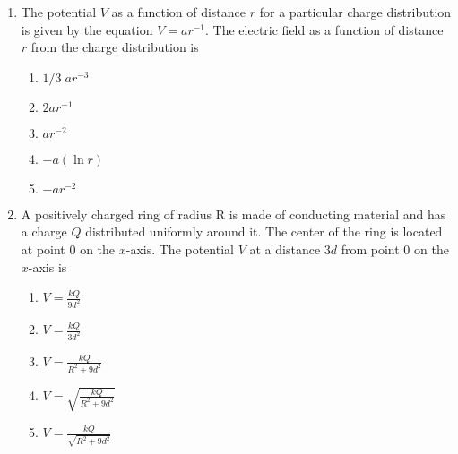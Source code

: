 \documentclass{../../oss-apphys}
\begin{document}
\begin{multicols}{2}
\begin{enumerate}[leftmargin=18pt]
  \item The potential $V$ as a function of distance $r$ for a particular charge
    distribution is given by the equation $V=ar^{-1}$. The electric field as
    a function of distance $r$ from the charge distribution is
    \begin{enumerate}[noitemsep,topsep=0pt,leftmargin=18pt,label=(\Alph*)]
    \item $1/3\;ar^{-3}$
    \item $2ar^{-1}$
    \item $ar^{−2}$
    \item $−a(\ln r)$
    \item $−ar^{-2}$
    \end{enumerate}
    \columnbreak
    
  \item A positively charged ring of radius R is made of conducting material and
    has a charge $Q$ distributed uniformly around it. The center of the ring is
    located at point 0 on the $x$-axis. The potential $V$ at a distance $3d$
    from point 0 on the $x$-axis is
    \begin{center}
      \vspace{-.1in}
    \end{center}

    \begin{enumerate}[noitemsep,topsep=0pt,leftmargin=18pt,label=(\Alph*)]  
    \item $\displaystyle V=\frac{kQ}{9d^2}$
    \item $\displaystyle V=\frac{kQ}{3d^2}$
    \item $\displaystyle V=\frac{kQ}{R^2+9d^2}$
    \item $\displaystyle V=\sqrt{\frac{kQ}{R^2+9d^2}}$
    \item $\displaystyle V=\frac{kQ}{\sqrt{R^2+9d^2}}$
    \end{enumerate}
  \end{enumerate}
\end{multicols}
\end{document}
